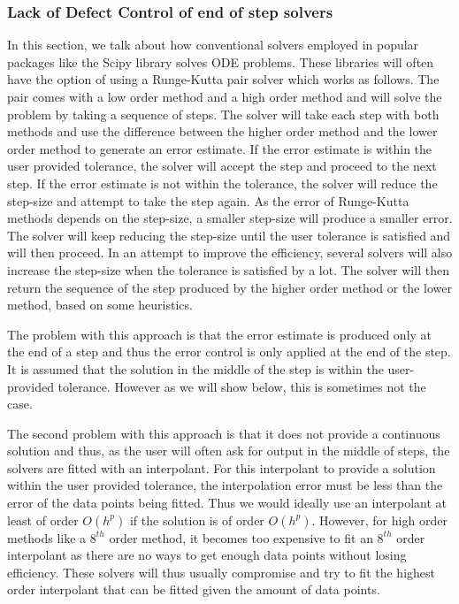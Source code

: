 \documentclass{article}
\begin{document}
\subsubsection{Lack of Defect Control of end of step solvers}
\label{section:end_of_step_innacurate}
In this section, we talk about how conventional solvers employed in popular packages like the Scipy library solves ODE problems. These libraries will often have the option of using a Runge-Kutta pair solver which works as follows. The pair comes with a low order method and a high order method and will solve the problem by taking a sequence of steps. The solver will take each step with both methods and use the difference between the higher order method and the lower order method to generate an error estimate. If the error estimate is within the user provided tolerance, the solver will accept the step and proceed to the next step. If the error estimate is not within the tolerance, the solver will reduce the step-size and attempt to take the step again. As the error of Runge-Kutta methods depends on the step-size, a smaller step-size will produce a smaller error. The solver will keep reducing the step-size until the user tolerance is satisfied and will then proceed. In an attempt to improve the efficiency, several solvers will also increase the step-size when the tolerance is satisfied by a lot. The solver will then return the sequence of the step produced by the higher order method or the lower method, based on some heuristics.  

The problem with this approach is that the error estimate is produced only at the end of a step and thus the error control is only applied at the end of the step. It is assumed that the solution in the middle of the step is within the user-provided tolerance. However as we will show below, this is sometimes not the case.

The second problem with this approach is that it does not provide a continuous solution and thus, as the user will often ask for output in the middle of steps, the solvers are fitted with an interpolant. For this interpolant to provide a solution within the user provided tolerance, the interpolation error must be less than the error of the data points being fitted. Thus we would ideally use an interpolant at least of order $O(h^{p})$ if the solution is of order $O(h^{p})$. However, for high order methods like a $8^{th}$ order method, it becomes too expensive to fit an $8^{th}$ order interpolant as there are no ways to get enough data points without losing efficiency. These solvers will thus usually compromise and try to fit the highest order interpolant that can be fitted given the amount of data points. 
\end{document}
